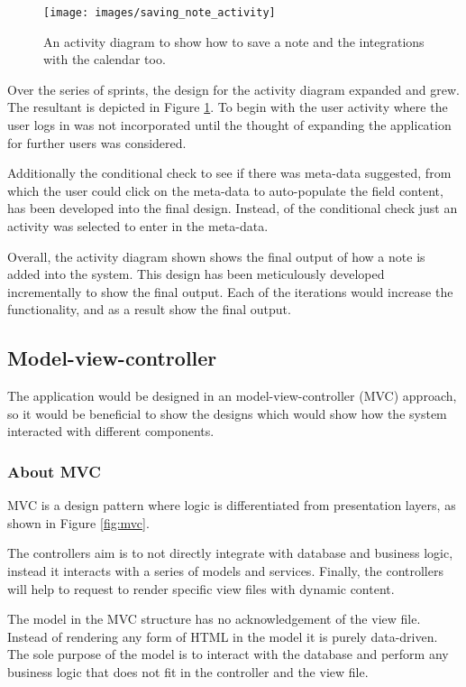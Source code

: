 \begin{figure}[h]
  \centering
  \texttt{[image: images/saving\_note\_activity]}
  \caption{An activity diagram to show how to save a note and the integrations with the calendar too.}
  \label{fig:activity_show_note}
\end{figure}

Over the series of sprints, the design for the activity diagram expanded and grew. The resultant is depicted in Figure \ref{fig:activity_show_note}. To begin with the user activity where the user logs in was not incorporated until the thought of expanding the application for further users was considered.

Additionally the conditional check to see if there was meta-data suggested, from which the user could click on the meta-data to auto-populate the field content, has been developed into the final design. Instead, of the conditional check just an activity was selected to enter in the meta-data.

Overall, the activity diagram shown shows the final output of how a note is added into the system. This design has been meticulously developed incrementally to show the final output. Each of the iterations would increase the functionality, and as a result show the final output.

\subsection{Model-view-controller}
The application would be designed in an model-view-controller (MVC) approach, so it would be beneficial to show the designs which would show how the system interacted with different components.

\subsubsection{About MVC}
MVC is a design pattern where logic is differentiated from presentation layers, as shown in Figure \ref{fig:mvc}.

The controllers aim is to not directly integrate with database and business logic, instead it interacts with a series of models and services. Finally, the controllers will help to request to render specific view files with dynamic content.

The model in the MVC structure has no acknowledgement of the view file. Instead of rendering any form of HTML in the model it is purely data-driven. The sole purpose of the model is to interact with the database and perform any business logic that does not fit in the controller and the view file.

